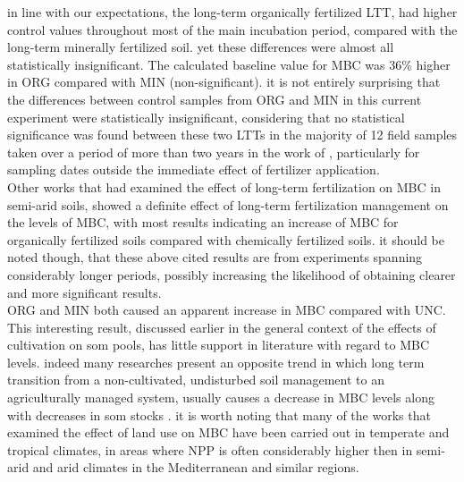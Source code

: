 	in line with our expectations, the long-term organically fertilized LTT, had higher control values throughout most of the main incubation period, compared with the long-term minerally fertilized soil. yet these differences were almost all statistically insignificant. The calculated baseline value for MBC was 36\% higher in ORG compared with MIN (non-significant). it is not entirely surprising that the differences between control samples from ORG and MIN in this current experiment were statistically insignificant, considering that no statistical significance was found between these  two LTTs in the majority of 12 field samples taken over a period of more than two years in the work of \citet{rotbart2018}, particularly for sampling dates outside the immediate effect of fertilizer application.\\
	Other works that had examined the effect of long-term fertilization on MBC in semi-arid soils, showed a definite effect of long-term fertilization management on the levels of MBC, with most results indicating an increase of MBC for organically fertilized soils compared with chemically fertilized soils\citep{luo2015, liu2013, ghoshal1995}. it should be noted though, that these above cited results are from experiments spanning considerably longer periods, possibly increasing the likelihood of obtaining clearer and more significant results.\\
	ORG and MIN both caused an apparent increase in MBC compared with UNC. This interesting result, discussed earlier in the general context of the effects of cultivation on \gls{som} pools, has little support in literature with regard to MBC levels. indeed many researches present an opposite trend in which long term transition from a non-cultivated, undisturbed soil management to an agriculturally managed system, usually causes a decrease in MBC levels along with decreases in \gls{som} stocks \citep{benbi2015, yu2013,zhou2018}. it is worth noting that many of the works that examined the effect of land use on MBC have been carried out in temperate and tropical climates, in areas where NPP is often considerably higher then in semi-arid and arid climates in the Mediterranean and similar regions.\\
